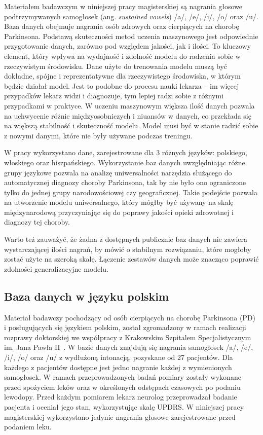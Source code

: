 Materiałem badawczym w niniejszej pracy magisterskiej są nagrania głosowe podtrzymywanych samogłosek (ang. \emph{sustained vowels}) /a/, /e/, /i/, /o/ oraz /u/.
Baza danych obejmuje nagrania osób zdrowych oraz cierpiących na chorobę Parkinsona.
Podstawą skuteczności metod uczenia maszynowego jest odpowiednie przygotowanie danych, zarówno pod względem jakości, jak i ilości.
To kluczowy element, który wpływa na wydajność i zdolność modelu do radzenia sobie w rzeczywistym środowisku.
Dane użyte do trenowania modelu muszą być dokładne, spójne i reprezentatywne dla rzeczywistego środowiska, w którym będzie działał model.
Jest to podobne do procesu nauki lekarza – im więcej przypadków lekarz widzi i diagnozuje, tym lepiej radzi sobie z różnymi przypadkami w praktyce.
W  uczeniu maszynowym większa ilość danych pozwala na uchwycenie różnic międzyosobniczych i niuansów w danych, co przekłada się na większą stabilność i skuteczność modelu.
Model musi być w stanie radzić sobie z nowymi danymi, które nie były używane podczas treningu.

W pracy wykorzystano dane, zarejestrowane dla 3 różnych języków: polskiego, włoskiego oraz hiszpańskiego.
Wykorzystanie baz danych uwzględniając różne grupy językowe pozwala na analizę uniwersalności narzędzia służącego do automatycznej diagnozy choroby Parkinsona, tak by nie było ono ograniczone tylko do jednej grupy narodowościowej czy geograficznej.
Takie podejście pozwala na utworzenie modelu uniwersalnego, który mógłby być używany na skalę międzynarodową przyczyniając się do poprawy jakości opieki zdrowotnej i diagnozy tej choroby.

Warto też zauważyć, że żadna z dostępnych publicznie baz danych nie zawiera wystarczającej ilości nagrań, by mówić o stabilnym rozwiązaniu, które mogłoby zostać użyte na szeroką skalę.
Łączenie zestawów danych może znacząco poprawić zdolności generalizacyjne modelu.

\subsection{Baza danych w języku polskim}
\label{subsec:polska-baza}

Materiał badawczy pochodzący od osób cierpiących na chorobę Parkinsona (PD) i posługujących się językiem polskim, został zgromadzony w ramach
realizacji rozprawy doktorskiej we współpracy z Krakowskim Szpitalem Specjalistycznym im.
Jana Pawła II~\cite{daria:2018}.
W bazie danych znajdują się nagrania samogłosek /a/, /e/, /i/, /o/ oraz /u/ z wydłużoną intonacją, pozyskane od 27 pacjentów.
Dla każdego z pacjentów dostępne jest jedno nagranie każdej z wymienionych samogłosek.
W ramach przeprowadzonych badań pomiary zostały wykonane przed spożyciem leków oraz w określonych odstępach czasowych po podaniu lewodopy.
Przed każdym pomiarem lekarz neurolog przeprowadzał badanie pacjenta i oceniał jego stan, wykorzystując skalę UPDRS\@.
W niniejszej pracy magisterskiej wykorzystano jedynie nagrania głosowe zarejestrowane przed podaniem leku.

